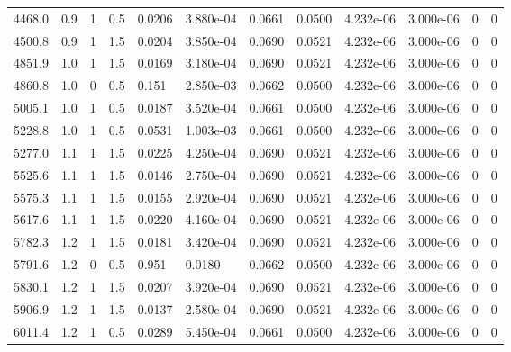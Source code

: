 \documentclass[preview]{standalone}
\begin{document}
{{\begin{tabular}{L{1.2cm}C{1.2cm} C{0.3cm}C{0.5cm} C{1.4cm}C{1.4cm} C{1.4cm}C{1.4cm} C{1.6cm}C{1.6cm} C{1.6cm}C{1.6cm}}
  4468.0  &   0.9  & 1     & 0.5 &  0.0206  & 3.880e-04  &  0.0661&   0.0500& 4.232e-06 & 3.000e-06   &  0 & 0  \\ 
  4500.8  &   0.9  & 1     & 1.5 &  0.0204  & 3.850e-04  &  0.0690&   0.0521& 4.232e-06 & 3.000e-06   &  0 & 0  \\ 
  4851.9  &   1.0  & 1     & 1.5 &  0.0169  & 3.180e-04  &  0.0690&   0.0521& 4.232e-06 & 3.000e-06   &  0 & 0  \\ 
  4860.8  &   1.0  & 0     & 0.5 &  0.151  & 2.850e-03  &  0.0662&   0.0500& 4.232e-06 & 3.000e-06   &  0 & 0  \\ 
  5005.1  &   1.0  & 1     & 0.5 &  0.0187  & 3.520e-04  &  0.0661&   0.0500& 4.232e-06 & 3.000e-06   &  0 & 0  \\ 
  5228.8  &   1.0  & 1     & 0.5 &  0.0531  & 1.003e-03  &  0.0661&   0.0500& 4.232e-06 & 3.000e-06   &  0 & 0  \\ 
  5277.0  &   1.1  & 1     & 1.5 &  0.0225  & 4.250e-04  &  0.0690&   0.0521& 4.232e-06 & 3.000e-06   &  0 & 0  \\ 
  5525.6  &   1.1  & 1     & 1.5 &  0.0146  & 2.750e-04  &  0.0690&   0.0521& 4.232e-06 & 3.000e-06   &  0 & 0  \\ 
  5575.3  &   1.1  & 1     & 1.5 &  0.0155  & 2.920e-04  &  0.0690&   0.0521& 4.232e-06 & 3.000e-06   &  0 & 0  \\ 
  5617.6  &   1.1  & 1     & 1.5 &  0.0220  & 4.160e-04  &  0.0690&   0.0521& 4.232e-06 & 3.000e-06   &  0 & 0  \\ 
  5782.3  &   1.2  & 1     & 1.5 &  0.0181  & 3.420e-04  &  0.0690&   0.0521& 4.232e-06 & 3.000e-06   &  0 & 0  \\ 
  5791.6  &   1.2  & 0     & 0.5 &  0.951  & 0.0180  &  0.0662&   0.0500& 4.232e-06 & 3.000e-06   &  0 & 0  \\ 
  5830.1  &   1.2  & 1     & 1.5 &  0.0207  & 3.920e-04  &  0.0690&   0.0521& 4.232e-06 & 3.000e-06   &  0 & 0  \\ 
  5906.9  &   1.2  & 1     & 1.5 &  0.0137  & 2.580e-04  &  0.0690&   0.0521& 4.232e-06 & 3.000e-06   &  0 & 0  \\ 
  6011.4  &   1.2  & 1     & 0.5 &  0.0289  & 5.450e-04  &  0.0661&   0.0500& 4.232e-06 & 3.000e-06   &  0 & 0  \\ 
\hline 
\end{tabular} 

}}
\end{document}
